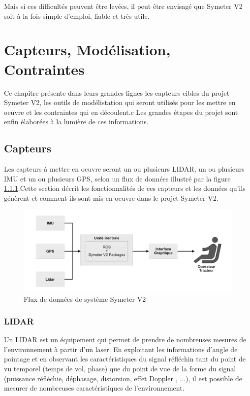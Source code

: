 \documentclass[12pt,a4paper]{report}
\begin{document}
		\para Mais si ces difficultés peuvent être levées, il peut être envisagé que Symeter V2 soit à la fois simple d'emploi, fiable et très utile.

		


\chapter{Capteurs, Modélisation, Contraintes}
	Ce chapitre présente dans leurs grandes lignes les capteurs cibles du projet Symeter V2, les outils de modélistation qui seront utilisés pour les mettre en oeuvre et les contraintes qui en découlent.c Les grandes étapes du projet sont enfin élaborées à la lumière de ces informations.
	
	\section{Capteurs}
		Les capteurs à mettre en oeuvre seront un ou plusieurs LIDAR, un ou plusieurs IMU et un ou plusieurs GPS, selon un flux de données illustré par la figure \ref{}.Cette section décrit les fonctionnalités de ces capteurs et les données qu'ils génèrent et comment ils sont mis en oeuvre dans le projet Symeter V2.
		
		\begin{figure}[h]
			\centering
			\includegraphics[width=0.9\linewidth]{img/fluxdonneeSymeterV2}
			\caption[fluxdonnéesymv2]{Flux de données de système Symeter V2}
			\label{fig:fluxdonneesymeterv2}
		\end{figure}
			
		\subsection{LIDAR}
		Un LIDAR est un équipement qui permet de prendre de nombreuses mesures de l'environnement à partir d'un laser. En exploitant les informations d'angle de pointage et en observant les caractéristiques du signal réfléchin tant du point de vu temporel (temps de vol, phase) que du point de vue de la forme du signal (puissance réfléchie, déphasage, distorsion, effet Doppler , ...), il est possible de mesurer de nombreuses caractéristiques de l'environnement.
		
\end{document}
